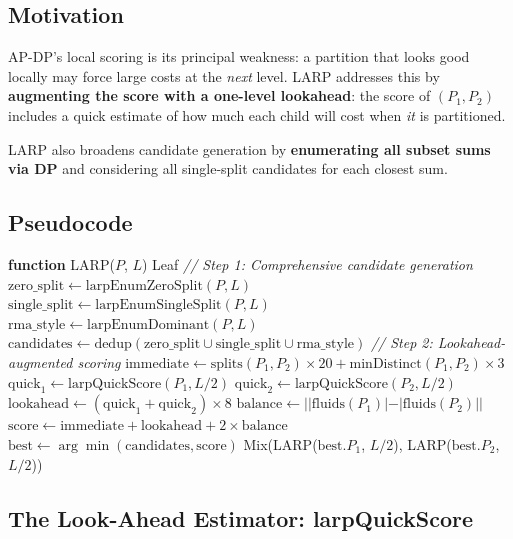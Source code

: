 \subsection{Motivation}

AP-DP's local scoring is its principal weakness: a partition that looks good locally may force large costs at the \textit{next} level. LARP addresses this by \textbf{augmenting the score with a one-level lookahead}: the score of $(P_1, P_2)$ includes a quick estimate of how much each child will cost when \textit{it} is partitioned.

LARP also broadens candidate generation by \textbf{enumerating all subset sums via DP} and considering all single-split candidates for each closest sum.

\subsection{Pseudocode}

\begin{algorithmic}[1]
\STATE \textbf{function} LARP($P$, $L$)
    \RETURN Leaf
\ENDIF
\STATE \textit{// Step 1: Comprehensive candidate generation}
\STATE $\text{zero\_split} \gets \text{larpEnumZeroSplit}(P, L)$
\STATE $\text{single\_split} \gets \text{larpEnumSingleSplit}(P, L)$
\STATE $\text{rma\_style} \gets \text{larpEnumDominant}(P, L)$
\STATE $\text{candidates} \gets \text{dedup}(\text{zero\_split} \cup \text{single\_split} \cup \text{rma\_style})$
\STATE \textit{// Step 2: Lookahead-augmented scoring}
    \STATE $\text{immediate} \gets \text{splits}(P_1, P_2) \times 20 + \text{minDistinct}(P_1, P_2) \times 3$
    \STATE $\text{quick}_1 \gets \text{larpQuickScore}(P_1, L/2)$
    \STATE $\text{quick}_2 \gets \text{larpQuickScore}(P_2, L/2)$
    \STATE $\text{lookahead} \gets (\text{quick}_1 + \text{quick}_2) \times 8$
    \STATE $\text{balance} \gets ||\text{fluids}(P_1)| - |\text{fluids}(P_2)||$
    \STATE $\text{score} \gets \text{immediate} + \text{lookahead} + 2 \times \text{balance}$
\ENDFOR
\STATE $\text{best} \gets \arg\min(\text{candidates}, \text{score})$
\RETURN Mix(LARP($\text{best}.P_1$, $L/2$), LARP($\text{best}.P_2$, $L/2$))
\end{algorithmic}

\subsection{The Look-Ahead Estimator: larpQuickScore}

